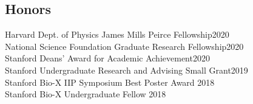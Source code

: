 \documentclass[margin,11pt]{res}
\newenvironment{myitemize}
{ \vspace{-1.5\topsep} \begin{itemize} \setlength\itemsep{0em}}
{ \end{itemize} \vspace{-0.5\topsep}}
\begin{document}
\begin{resume}




\section{Honors}
 
Harvard Dept. of Physics James Mills Peirce Fellowship\hfill 2020 \\
National Science Foundation Graduate Research Fellowship\hfill 2020 \\
Stanford Deans' Award for Academic Achievement\hfill 2020 \\
Stanford Undergraduate Research and Advising Small Grant\hfill 2019 \\
Stanford Bio-X IIP Symposium Best Poster Award \hfill 2018 \\
Stanford Bio-X Undergraduate Fellow \hfill 2018


\end{resume}
\end{document}
